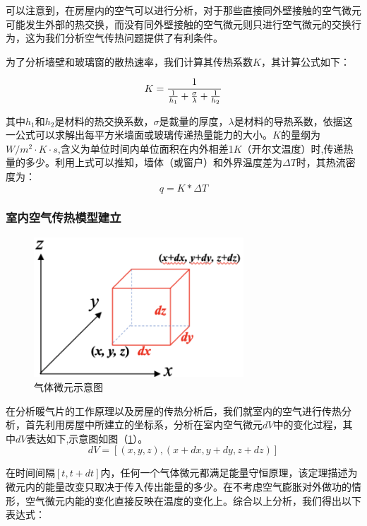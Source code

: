 \documentclass{my_paper}
\begin{document}
可以注意到，在房屋内的空气可以进行分析，对于那些直接同外壁接触的空气微元可能发生外部的热交换，而没有同外壁接触的空气微元则只进行空气微元的交换行为，这为我们分析空气传热问题提供了有利条件。

为了分析墙壁和玻璃窗的散热速率，我们计算其传热系数$K$\cite{1}，其计算公式如下：

\begin{equation}
    \large K = \frac{1}{\frac{1}{h_1}+\frac{\sigma}{\lambda}+\frac{1}{h_2}}
    \label{16}
\end{equation}

其中$h_1$和$ h_2 $是材料的热交换系数，$ \sigma $是裁量的厚度，$ \lambda $是材料的导热系数，依据这一公式可以求解出每平方米墙面或玻璃传递热量能力的大小。$K$的量纲为$W/m^2\cdot K \cdot s$,含义为单位时间内单位面积在内外相差1$K$（开尔文温度）时,传递热量的多少。利用上式可以推知，墙体（或窗户）和外界温度差为$\Delta T$时，其热流密度为：
\begin{equation}
    q = K * \Delta T
    \label{17}
\end{equation}
\subsubsection{室内空气传热模型建立}
\begin {figure}[h]
\centering %
\includegraphics[width=0.7\textwidth]{weiyuan.png}
\caption{气体微元示意图} %
\label{weiyuan}
\end {figure}
在分析暖气片的工作原理以及房屋的传热分析后，我们就室内的空气进行传热分析，首先利用房屋中所建立的坐标系，分析在室内空气微元$dV$中的变化过程，其中$dV$表达如下,示意图如图（\ref{weiyuan}）。
\begin{equation}
dV = [(x,y,z),(x+dx,y+dy,z+dz)]
\label{}
\end{equation}

在时间间隔$[t,t+dt]$内，任何一个气体微元都满足能量守恒原理，该定理描述为微元内的能量改变只取决于传入传出能量的多少。在不考虑空气膨胀对外做功的情形，空气微元内能的变化直接反映在温度的变化上。综合以上分析，我们得出以下表达式：
\end{document}
